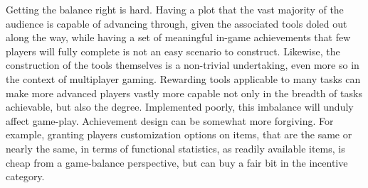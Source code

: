 Getting the balance right is hard. Having a plot that the vast
majority of the audience is capable of advancing through, given the
associated tools doled out along the way, while having a set of
meaningful in-game achievements that few players will fully complete
is not an easy scenario to construct. Likewise, the construction of
the tools themselves is a non-trivial undertaking, even more so in the
context of multiplayer gaming. Rewarding tools applicable to many
tasks can make more advanced players vastly more capable not only in
the breadth of tasks achievable, but also the degree. Implemented
poorly, this imbalance will unduly affect game-play. Achievement design
can be somewhat more forgiving. For example, granting players
customization options on items, that are the same or nearly the same,
in terms of functional statistics, as readily available items, is
cheap from a game-balance perspective, but can buy a fair bit in the
incentive category.

